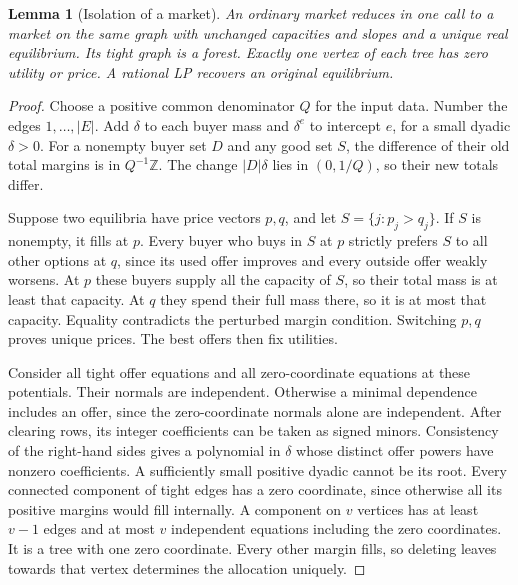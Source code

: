 \documentclass[11pt]{article}
\newtheorem{lemma}[theorem]{Lemma}
\begin{document}
\begin{lemma}[Isolation of a market]\label{lem:isolate}
An ordinary market reduces in one call to a market on the same graph
with unchanged capacities and slopes and a unique real equilibrium.
Its tight graph is a forest. Exactly one vertex of each tree has zero
utility or price. A rational LP recovers an original equilibrium.
\end{lemma}
\begin{proof}
Choose a positive common denominator \(Q\) for the input data. Number
the edges \(1,\ldots,|E|\). Add \(\delta\) to each buyer mass and
\(\delta^e\) to intercept \(e\), for a small dyadic \(\delta>0\).
For a nonempty buyer set \(D\) and any good set \(S\), the difference
of their old total margins is in \(Q^{-1}\mathbb Z\). The change
\(|D|\delta\) lies in \((0,1/Q)\), so their new totals differ.

Suppose two equilibria have price vectors \(p,q\), and let
\(S=\{j:p_j>q_j\}\). If \(S\) is nonempty, it fills at \(p\). Every
buyer who buys in \(S\) at \(p\) strictly prefers \(S\) to all other
options at \(q\), since its used offer improves and every outside offer
weakly worsens. At \(p\) these buyers supply all the capacity of \(S\),
so their total mass is at least that capacity. At \(q\) they spend their
full mass there, so it is at most that capacity. Equality contradicts
the perturbed margin condition. Switching \(p,q\) proves unique
prices. The best offers then fix utilities.

Consider all tight offer equations and all zero-coordinate equations at
these potentials. Their normals are independent. Otherwise a minimal
dependence includes an offer, since the zero-coordinate normals alone are
independent. After clearing rows, its integer coefficients can be taken as
signed minors. Consistency of the right-hand sides gives a polynomial in
\(\delta\) whose distinct offer powers have nonzero coefficients. A
sufficiently small positive dyadic cannot be its root. Every connected
component of tight edges has a zero coordinate, since otherwise all its
positive margins would fill internally. A component on \(v\) vertices
has at least \(v-1\) edges and at most \(v\) independent equations
including the zero coordinates. It is a tree with one zero coordinate.
Every other margin fills, so deleting leaves towards that vertex
determines the allocation uniquely.


\end{proof}
\end{document}
